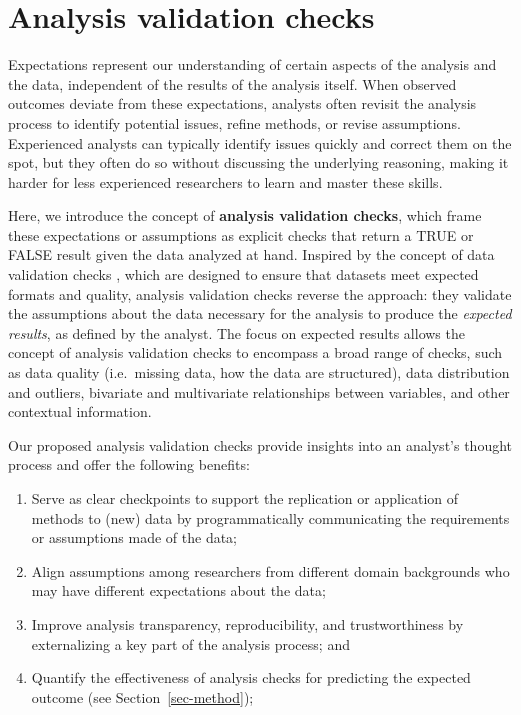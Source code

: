 \documentclass[
  12pt,
]{interact}
\providecommand{\tightlist}{%
  \setlength{\itemsep}{0pt}\setlength{\parskip}{0pt}}\usepackage{longtable,booktabs,array}
\begin{document}
\section{Analysis validation checks}\label{sec-plan}

Expectations represent our understanding of certain aspects of the
analysis and the data, independent of the results of the analysis
itself. When observed outcomes deviate from these expectations, analysts
often revisit the analysis process to identify potential issues, refine
methods, or revise assumptions. Experienced analysts can typically
identify issues quickly and correct them on the spot, but they often do
so without discussing the underlying reasoning, making it harder for
less experienced researchers to learn and master these skills.

Here, we introduce the concept of \textbf{analysis validation checks},
which frame these expectations or assumptions as explicit checks that
return a TRUE or FALSE result given the data analyzed at hand. Inspired
by the concept of data validation checks \citep{validate}, which are
designed to ensure that datasets meet expected formats and quality,
analysis validation checks reverse the approach: they validate the
assumptions about the data necessary for the analysis to produce the
\emph{expected results}, as defined by the analyst. The focus on
expected results allows the concept of analysis validation checks to
encompass a broad range of checks, such as data quality (i.e.~missing
data, how the data are structured), data distribution and outliers,
bivariate and multivariate relationships between variables, and other
contextual information.

Our proposed analysis validation checks provide insights into an
analyst's thought process and offer the following benefits:

\begin{enumerate}
\def\labelenumi{\arabic{enumi}.}
\tightlist
\item
  Serve as clear checkpoints to support the replication or application
  of methods to (new) data by programmatically communicating the
  requirements or assumptions made of the data;
\item
  Align assumptions among researchers from different domain backgrounds
  who may have different expectations about the data;
\item
  Improve analysis transparency, reproducibility, and trustworthiness by
  externalizing a key part of the analysis process; and
\item
  Quantify the effectiveness of analysis checks for predicting the
  expected outcome (see Section~\ref{sec-method});
\end{enumerate}
\end{document}
